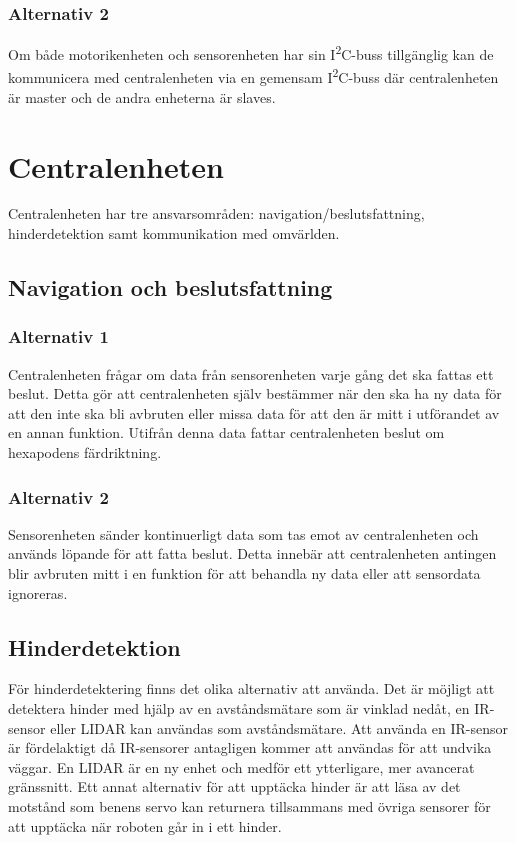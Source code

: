 \documentclass[a4paper,titlepage,12pt]{article}
\newcommand{\itc}{I\textsuperscript{2}C}
\begin{document}
	\subsubsection{Alternativ 2}
	Om både motorikenheten och sensorenheten har sin \itc{}-buss tillgänglig kan de kommunicera med centralenheten via en gemensam \itc{}-buss där centralenheten är master och de andra enheterna är slaves. 
	
	\section{Centralenheten}
	Centralenheten har tre ansvarsområden: navigation/beslutsfattning, hinderdetektion samt
	kommunikation med omvärlden.

	\subsection{Navigation och beslutsfattning}
  
  \subsubsection{Alternativ 1}
  Centralenheten frågar om data från sensorenheten varje gång det ska fattas ett
  beslut. Detta gör att centralenheten själv bestämmer när den ska ha ny data
  för att den inte ska bli avbruten eller missa data för att den är mitt i
  utförandet av en annan funktion. Utifrån denna data fattar centralenheten
  beslut om hexapodens färdriktning.
  
  \subsubsection{Alternativ 2}
  Sensorenheten sänder kontinuerligt data som tas emot av centralenheten och används löpande för att fatta beslut. Detta innebär att centralenheten antingen blir avbruten mitt i en funktion för att behandla ny data eller att sensordata ignoreras. 
  
	\subsection{Hinderdetektion}
	För hinderdetektering finns det olika alternativ att använda. Det är möjligt att 
	detektera hinder med hjälp av en avståndsmätare som är vinklad nedåt, en IR-sensor 
	eller LIDAR kan användas som avståndsmätare. Att använda en IR-sensor är fördelaktigt 
	då IR-sensorer antagligen kommer att användas för att undvika väggar. En 
	LIDAR är en ny enhet och medför ett ytterligare, mer avancerat gränssnitt. Ett annat 
	alternativ för att upptäcka hinder är att läsa av det motstånd som benens servo kan 
	returnera tillsammans med övriga sensorer för att upptäcka när roboten går in i ett 
	hinder. 
\end{document}
